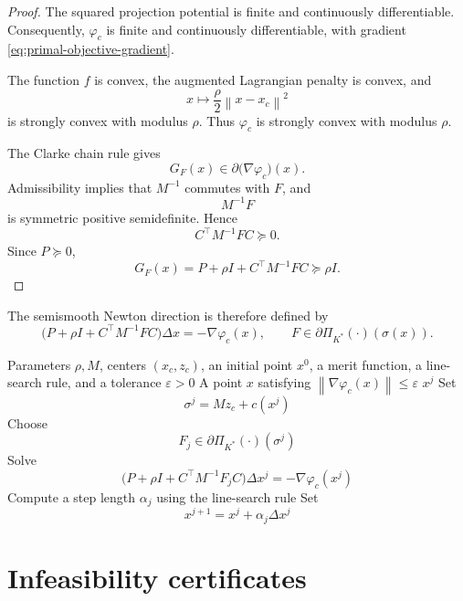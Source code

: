 \documentclass[a4paper,11pt]{book}
\theoremstyle{plain}
\theoremstyle{definition}
\theoremstyle{remark}
\numberwithin{equation}{chapter}
\numberwithin{algorithm}{chapter}
\newcommand{\proj}[2]{\Pi_{#2}\!\left(#1\right)}
\newcommand{\norm}[1]{\left\|#1\right\|}
\begin{document}
	\begin{proof}
		The squared projection potential is finite and continuously differentiable.
		Consequently, \(\varphi_c\) is finite and continuously differentiable, with
		gradient \eqref{eq:primal-objective-gradient}.
		
		The function \(f\) is convex, the augmented Lagrangian penalty is convex,
		and
		\[
		x\longmapsto\frac{\rho}{2}\norm{x-x_c}^2
		\]
		is strongly convex with modulus \(\rho\). Thus \(\varphi_c\) is strongly
		convex with modulus \(\rho\).
		
		The Clarke chain rule gives
		\[
		G_F(x)
		\in
		\partial\bigl(\nabla\varphi_c\bigr)(x).
		\]
		Admissibility implies that \(M^{-1}\) commutes with \(F\), and
		\[
		M^{-1}F
		\]
		is symmetric positive semidefinite. Hence
		\[
		C^\top M^{-1}FC\succeq0.
		\]
		Since \(P\succeq0\),
		\[
		G_F(x)
		=
		P+\rho I+C^\top M^{-1}FC
		\succeq
		\rho I.
		\]
	\end{proof}
	
	The semismooth Newton direction is therefore defined by
	\begin{equation}
		\bigl(
		P+\rho I+C^\top M^{-1}FC
		\bigr)\Delta x
		=
		-\nabla\varphi_c(x),
		\qquad
		F\in\partial\proj{\cdot}{K^*}(\sigma(x)).
		\label{eq:primal-semismooth-newton-system}
	\end{equation}
	
	\begin{algorithm}[H]
		\caption{Semismooth Newton method for the primal proximal problem}
		\begin{algorithmic}[1]
			\Require Parameters \(\rho,M\), centers \((x_c,z_c)\), an initial point
			\(x^0\), a merit function, a line-search rule, and a tolerance
			\(\varepsilon>0\)
			\Ensure A point \(x\) satisfying
			\(\norm{\nabla\varphi_c(x)}\leq\varepsilon\)
			\If{\(\norm{\nabla\varphi_c(x^j)}\leq\varepsilon\)}
			\State \Return \(x^j\)
			\EndIf
			\State Set
			\[
			\sigma^j=Mz_c+c(x^j)
			\]
			\State Choose
			\[
			F_j\in\partial\proj{\cdot}{K^*}(\sigma^j)
			\]
			\State Solve
			\[
			\bigl(
			P+\rho I+C^\top M^{-1}F_jC
			\bigr)\Delta x^j
			=
			-\nabla\varphi_c(x^j)
			\]
			\State Compute a step length \(\alpha_j\) using the line-search rule
			\State Set
			\[
			x^{j+1}=x^j+\alpha_j\Delta x^j
			\]
			\EndFor
		\end{algorithmic}
	\end{algorithm}
	
	\section{Infeasibility certificates}
	
\end{document}
